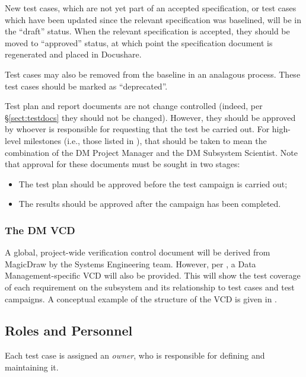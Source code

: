 New test cases, which are not yet part of an accepted specification, or test cases which have been updated since the relevant specification was baselined, will be in the ``draft'' status.
When the relevant specification is accepted, they should be moved to ``approved'' status, at which point the specification document is regenerated and placed in Docushare.

Test cases may also be removed from the baseline in an analagous process.
These test cases should be marked as ``deprecated''.

Test plan and report documents are not change controlled (indeed, per \S\ref{sect:testdocs} they should not be changed).
However, they should be approved by whoever is responsible for requesting that the test be carried out.
For high-level milestones (i.e., those listed in ), that should be taken to mean the combination of the DM Project Manager and the DM Subsystem Scientist.
Note that approval for these documents must be sought in two stages:

\begin{itemize}

  \item{The test plan should be approved before the test campaign is carried out;}
  \item{The results should be approved after the campaign has been completed.}

\end{itemize}

\subsubsection{The DM VCD}

A global, project-wide verification control document will be derived from MagicDraw by the Systems Engineering team.
However, per , a Data Management-specific VCD will also be provided.
This will show the test coverage of each requirement on the subsystem and its relationship to test cases and test campaigns.
A conceptual example of the structure of the VCD is given in .



\subsection{Roles and Personnel}
\label{sect:roles}

Each test case is assigned an \emph{owner}, who is responsible for defining and maintaining it.

